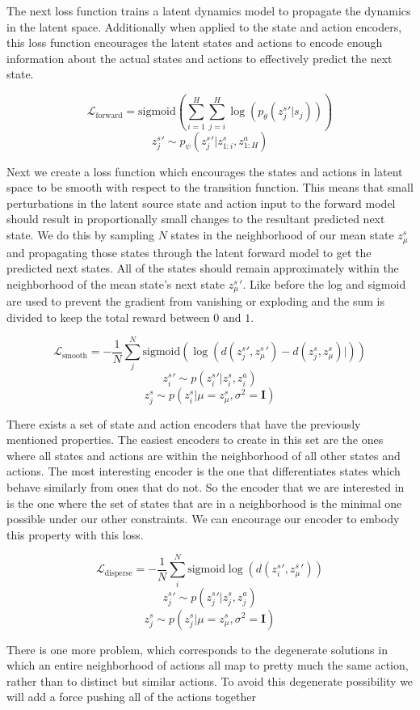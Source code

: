 \documentclass{article}
\begin{document}
The next loss function trains a latent dynamics model to propagate the dynamics in the latent space.
Additionally when applied to the state and action encoders, this loss function encourages the latent states and actions to encode enough information about the actual states and actions to effectively predict the next state.

$$\mathcal{L}_{\text{forward}} = \text{sigmoid}\left(\sum\limits_{i=1}^H \sum\limits_{j=i}^H \log(p_\theta({z^s_j}' | s_j))\right)$$
$${z^s_j}' \sim p_\psi({z^s_j}' | z^s_{1:i},z^a_{1:H})$$


Next we create a loss function which encourages the states and actions in latent space to be smooth with respect to the transition function.
This means that small perturbations in the latent source state and action input to the forward model should result in proportionally small changes to the resultant predicted next state.
We do this by sampling $N$ states in the neighborhood of our mean state $z_\mu^s$ and propagating those states through the latent forward model to get the predicted next states.
All of the states should remain approximately within the neighborhood of the mean state's next state ${z_\mu^s}'$.
Like before the log and sigmoid are used to prevent the gradient from vanishing or exploding and the sum is divided to keep the total reward between $0$ and $1$.

$$\mathcal{L}_\text{smooth} = -\frac{1}{N}\sum\limits_j^N \text{sigmoid}(\log(d({z^s_j}', {z^s_\mu}') - d({z^s_j}, {z^s_\mu})|))$$
$${z^s_i}' \sim p({z^s_i}'|z^s_i,z^a_i)$$
$$z^s_j \sim p(z^s_i | \mu=z^s_\mu, \sigma^2=\mathbf{I})$$


There exists a set of state and action encoders that have the previously mentioned properties.
The easiest encoders to create in this set are the ones where all states and actions are within the neighborhood of all other states and actions.
The most interesting encoder is the one that differentiates states which behave similarly from ones that do not.
So the encoder that we are interested in is the one where the set of states that are in a neighborhood is the minimal one possible under our other constraints.
We can encourage our encoder to embody this property with this loss.

$$\mathcal{L}_\text{disperse} = -\frac{1}{N}\sum\limits_i^N \text{sigmoid}\log(d({z^s_i}', {z^s_\mu}'))$$
$${z^s_j}' \sim p({z^s_j}'|z^s_j,z^a_j)$$
$$z^s_j \sim p(z^s_j | \mu=z^s_\mu, \sigma^2=\mathbf{I})$$


There is one more problem, which corresponds to the degenerate solutions in which an entire neighborhood of actions all map to pretty much the same action, rather than to distinct but similar actions.
To avoid this degenerate possibility we will add a force pushing all of the actions together
\end{document}
